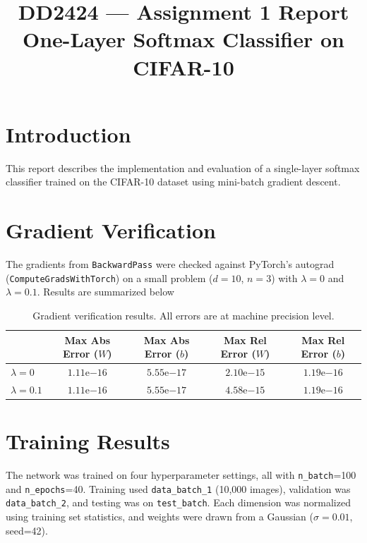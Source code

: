 \documentclass[11pt,a4paper]{article}
\title{\textbf{DD2424 --- Assignment 1 Report}\\[0.3em]
\large One-Layer Softmax Classifier on CIFAR-10}
\author{}
\date{}
\begin{document}
\maketitle

\section{Introduction}

This report describes the implementation and evaluation of a single-layer softmax classifier trained on the CIFAR-10 dataset using mini-batch gradient descent. 
\section{Gradient Verification}

The gradients from \texttt{BackwardPass} were checked against PyTorch's autograd (\texttt{ComputeGradsWithTorch}) on a small problem ($d=10$, $n=3$) with $\lambda=0$ and $\lambda=0.1$. Results are summarized below

\begin{table}[h]
\centering
\caption{Gradient verification results. All errors are at machine precision level.}
\begin{tabular}{@{}lcccc@{}}
\toprule
 & Max Abs Error ($W$) & Max Abs Error ($b$) & Max Rel Error ($W$) & Max Rel Error ($b$) \\
\midrule
$\lambda = 0$   & $1.11\mathrm{e}{-16}$ & $5.55\mathrm{e}{-17}$ & $2.10\mathrm{e}{-15}$ & $1.19\mathrm{e}{-16}$ \\
$\lambda = 0.1$ & $1.11\mathrm{e}{-16}$ & $5.55\mathrm{e}{-17}$ & $4.58\mathrm{e}{-15}$ & $1.19\mathrm{e}{-16}$ \\
\bottomrule
\end{tabular}
\end{table}


\section{Training Results}

The network was trained on four hyperparameter settings, all with \texttt{n\_batch}=100 and \texttt{n\_epochs}=40. Training used \texttt{data\_batch\_1} (10,000 images), validation was \texttt{data\_batch\_2}, and testing was on \texttt{test\_batch}. Each dimension was normalized using training set statistics, and weights were drawn from a Gaussian ($\sigma=0.01$, seed=42).
\end{document}
